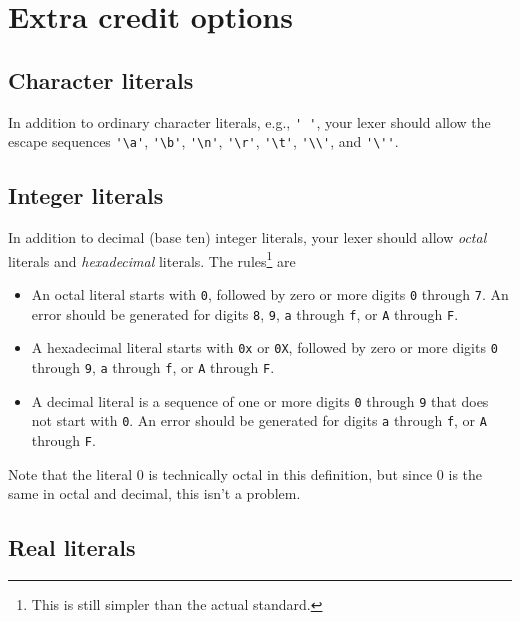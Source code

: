 \documentclass{article}
\begin{document}
\section{Extra credit options}

\subsection{Character literals}

In addition to ordinary character literals,
e.g., \verb|' '|,
your lexer should allow
the escape sequences
\verb|'\a'|, \verb|'\b'|, \verb|'\n'|, \verb|'\r'|, \verb|'\t'|, \verb|'\\'|,
and \verb|'\''|.

\subsection{Integer literals}

In addition to decimal (base ten) integer literals,
your lexer should allow \emph{octal} literals and \emph{hexadecimal} literals.
The rules\footnote{This is still simpler than the actual standard.} are
\begin{itemize}
	\item An octal literal starts with \verb|0|,
				followed by zero or more digits \verb|0| through \verb|7|.
				An error should be generated for digits \verb|8|, \verb|9|,
				\verb|a| through \verb|f|, or \verb|A| through \verb|F|.
	\item A hexadecimal literal starts with \verb|0x| or \verb|0X|,
		followed by zero or more digits \verb|0| through \verb|9|,
		\verb|a| through \verb|f|, or \verb|A| through \verb|F|.
	\item A decimal literal is
				a sequence of one or more digits \verb|0| through \verb|9|
				that does not start with \verb|0|.
				An error should be generated for digits
				\verb|a| through \verb|f|, or \verb|A| through \verb|F|.
\end{itemize}
Note that the literal 0 is technically octal in this definition,
but since 0 is the same in octal and decimal, this isn't a problem.

\subsection{Real literals}
\end{document}
